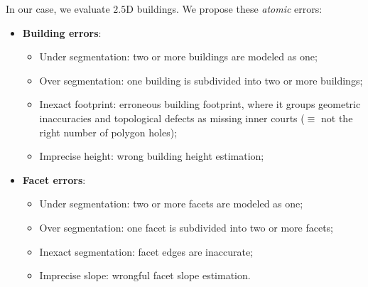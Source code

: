 \documentclass[runningheads]{llncs}
\begin{document}
In our case, we evaluate $2.5$D buildings. We propose these \textit{atomic} errors:
	\begin{itemize}
		\item \textbf{Building errors}:
        \begin{itemize}
        	\item Under segmentation: two or more buildings are modeled as one;
            \item Over segmentation: one building is subdivided into two or more buildings;
            \item Inexact footprint: erroneous building footprint, where it groups geometric inaccuracies and topological defects as missing inner courts ($\equiv$ not the right number of polygon holes);
            \item Imprecise height: wrong building height estimation;
        \end{itemize}
		\item \textbf{Facet errors}:
        \begin{itemize}
        	\item Under segmentation: two or more facets are modeled as one;
            \item Over segmentation: one facet is subdivided into two or more facets;
            \item Inexact segmentation: facet edges are inaccurate;
            \item Imprecise slope: wrongful facet slope estimation.
        \end{itemize}
	\end{itemize}
\end{document}
